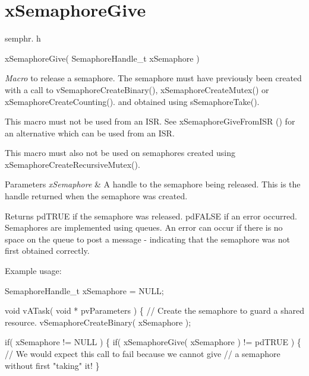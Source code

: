 \hypertarget{group__x_semaphore_give}{}\section{x\+Semaphore\+Give}
\label{group__x_semaphore_give}
semphr. h 
\begin{DoxyPre}xSemaphoreGive( SemaphoreHandle\_t xSemaphore )\end{DoxyPre}


{\itshape Macro} to release a semaphore. The semaphore must have previously been created with a call to v\+Semaphore\+Create\+Binary(), x\+Semaphore\+Create\+Mutex() or x\+Semaphore\+Create\+Counting(). and obtained using s\+Semaphore\+Take().

This macro must not be used from an I\+S\+R. See x\+Semaphore\+Give\+From\+I\+S\+R () for an alternative which can be used from an I\+S\+R.

This macro must also not be used on semaphores created using x\+Semaphore\+Create\+Recursive\+Mutex().


\begin{DoxyParams}{Parameters}
{\em x\+Semaphore} & A handle to the semaphore being released. This is the handle returned when the semaphore was created.\\
\hline
\end{DoxyParams}
\begin{DoxyReturn}{Returns}
pd\+T\+R\+U\+E if the semaphore was released. pd\+F\+A\+L\+S\+E if an error occurred. Semaphores are implemented using queues. An error can occur if there is no space on the queue to post a message -\/ indicating that the semaphore was not first obtained correctly.
\end{DoxyReturn}
Example usage\+: 
\begin{DoxyPre}
SemaphoreHandle\_t xSemaphore = NULL;\end{DoxyPre}



\begin{DoxyPre}void vATask( void * pvParameters )
\{
   // Create the semaphore to guard a shared resource.
   vSemaphoreCreateBinary( xSemaphore );\end{DoxyPre}



\begin{DoxyPre}   if( xSemaphore != NULL )
   \{
       if( xSemaphoreGive( xSemaphore ) != pdTRUE )
       \{
           // We would expect this call to fail because we cannot give
           // a semaphore without first "taking" it!
       \}\end{DoxyPre}



